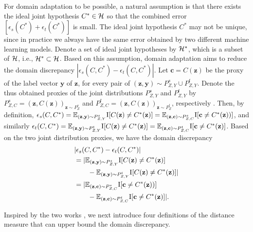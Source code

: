 \documentclass[letterpaper]{article} \usepackage{aaai20}  \usepackage{times}  \usepackage{helvet} \usepackage{courier}  \usepackage[hyphens]{url}  \usepackage{graphicx} \urlstyle{rm} \def\UrlFont{\rm}  \usepackage{graphicx}  \frenchspacing  \setlength{\pdfpagewidth}{8.5in}  \setlength{\pdfpageheight}{11in}
\begin{document}
For domain adaptation to be possible, a natural assumption is that there exists the ideal joint hypothesis $C^* \in \cal{H}$ so that the combined error $[\epsilon_s(C^*) + \epsilon_t(C^*)]$ is small. The ideal joint hypothesis $C^*$ may not be unique, since in practice we always have the same error obtained by two different machine learning models. Denote a set of ideal joint hypotheses by ${\cal{H}}^*$, which is a subset of $\cal{H}$, i.e., ${\cal{H}}^* \subset \cal{H}$. Based on this assumption, domain adaptation aims to reduce the domain discrepancy $|\epsilon_s(C, C^*) - \epsilon_t(C, C^*)|$. Let $\mathbf{c} = C(\mathbf{z})$ be the proxy of the label vector $\mathbf{y}$ of $\mathbf{z}$, for every pair of $(\mathbf{z}, \mathbf{y}) \sim P_{Z, Y}^s \cup P_{Z, Y}^t$. Denote the thus obtained proxies of the joint distributions $P_{Z, Y}^s$ and $P_{Z, Y}^t$ by $P_{Z, C}^s=(\mathbf{z}, C(\mathbf{z}))_{\mathbf{z} \sim P_{Z}^s}$ and $P_{Z, C}^t=(\mathbf{z}, C(\mathbf{z}))_{\mathbf{z} \sim P_{Z}^t}$, respectively \cite{jointDistOptimal}. Then, by definition, $\epsilon_s(C, C^*) = \mathbb{E}_{(\mathbf{z}, \mathbf{y}) \sim P_{Z, Y}^s} {\rm I} [C(\mathbf{z}) \ne C^*(\mathbf{z})] = \mathbb{E}_{(\mathbf{z}, \mathbf{c}) \sim P_{Z, C}^s} {\rm I} [\mathbf{c} \ne C^*(\mathbf{z}))]$, and similarly $\epsilon_t(C, C^*) = \mathbb{E}_{(\mathbf{z}, \mathbf{y}) \sim P_{Z, Y}^t} {\rm I} [C(\mathbf{z}) \ne C^*(\mathbf{z})] = \mathbb{E}_{(\mathbf{z}, \mathbf{c}) \sim P_{Z, C}^t} {\rm I} [ \mathbf{c} \ne C^*(\mathbf{z})]$. Based on the two joint distribution proxies, we have the domain discrepancy 
\begin{eqnarray}\label{EqnExpDistDiscBound0}
\begin{aligned}
& |\epsilon_s(C, C^*) - \epsilon_t(C, C^*)| \\
& = |\mathbb{E}_{(\mathbf{z}, \mathbf{y}) \sim P_{Z, Y}^s} {\rm I} [C(\mathbf{z}) \ne C^*(\mathbf{z})] \\& \qquad - \mathbb{E}_{(\mathbf{z}, \mathbf{y}) \sim P_{Z, Y}^t} {\rm I} [C(\mathbf{z}) \ne C^*(\mathbf{z})]| \\
& = |\mathbb{E}_{(\mathbf{z}, \mathbf{c}) \sim P_{Z, C}^s} {\rm I} [\mathbf{c} \ne C^*(\mathbf{z}))] \\& \qquad - \mathbb{E}_{(\mathbf{z}, \mathbf{c}) \sim P_{Z, C}^t} {\rm I} [ \mathbf{c} \ne C^*(\mathbf{z})]|. 
\end{aligned}
\end{eqnarray}

Inspired by the two works \cite{cdan,da_theory3}, we next introduce four definitions of the distance measure that can upper bound the domain discrepancy.
\end{document}
